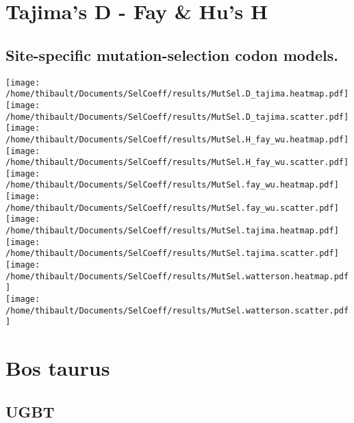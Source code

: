 \section{Tajima's D - Fay \& Hu's H} 
 
\subsection{Site-specific mutation-selection codon models.} 
\begin{center}
\texttt{[image: /home/thibault/Documents/SelCoeff/results/MutSel.D\_tajima.heatmap.pdf]} \\
\texttt{[image: /home/thibault/Documents/SelCoeff/results/MutSel.D\_tajima.scatter.pdf]} \\
\texttt{[image: /home/thibault/Documents/SelCoeff/results/MutSel.H\_fay\_wu.heatmap.pdf]} \\
\texttt{[image: /home/thibault/Documents/SelCoeff/results/MutSel.H\_fay\_wu.scatter.pdf]} \\
\texttt{[image: /home/thibault/Documents/SelCoeff/results/MutSel.fay\_wu.heatmap.pdf]} \\
\texttt{[image: /home/thibault/Documents/SelCoeff/results/MutSel.fay\_wu.scatter.pdf]} \\
\texttt{[image: /home/thibault/Documents/SelCoeff/results/MutSel.tajima.heatmap.pdf]} \\
\texttt{[image: /home/thibault/Documents/SelCoeff/results/MutSel.tajima.scatter.pdf]} \\
\texttt{[image: /home/thibault/Documents/SelCoeff/results/MutSel.watterson.heatmap.pdf]} \\
\texttt{[image: /home/thibault/Documents/SelCoeff/results/MutSel.watterson.scatter.pdf]} \\
\end{center}
\section{Bos taurus} 
 
\subsection{UGBT} 
 
